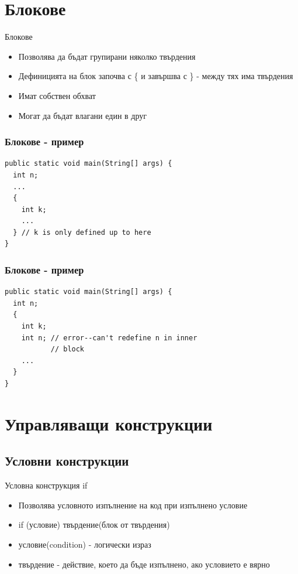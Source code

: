 \documentclass{beamer}
\begin{document}
\section{Блокове}
\begin{frame}{Блокове}
  \transdissolve
  \begin{itemize}
  \item Позволява да бъдат групирани няколко
    твърдения
   \item Дефиницията на блок започва с \{ и
      завършва с \} - между тях има
    твърдения
   \item Имат собствен обхват
   \item Могат да бъдат влагани един в друг
  \end{itemize}
\end{frame}

\begin{frame}[fragile]
  \transdissolve
  \frametitle{Блокове - пример}
\begin{lstlisting}
public static void main(String[] args) {
  int n;
  ...
  {
    int k;
    ... 
  } // k is only defined up to here
}
\end{lstlisting}
\end{frame}

\begin{frame}[fragile]
  \frametitle{Блокове - пример}
  \transdissolve
\begin{lstlisting}
public static void main(String[] args) {
  int n;
  {
    int k;
    int n; // error--can't redefine n in inner
           // block
    ...
  } 
}
\end{lstlisting}
\end{frame}

\section{Управляващи конструкции}
\subsection{Условни конструкции}

\begin{frame}{Условна конструкция if}
  \transdissolve
  \begin{itemize}
  \item Позволява условното изпълнение на код при изпълнено условие
  \item if (условие) твърдение(блок от твърдения)
  \item условие(condition) - логически израз
  \item твърдение - действие, което да бъде
    изпълнено, ако условието е вярно
  \end{itemize}
\end{frame}
\end{document}
